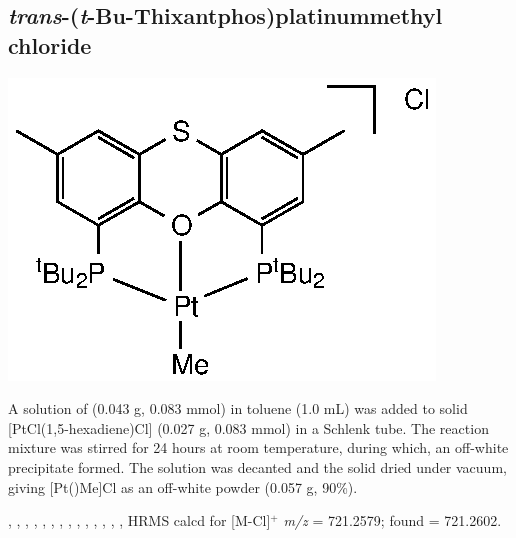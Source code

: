 \subsection*{\emph{trans}-(\emph{t}-Bu-Thixantphos)platinummethyl chloride}
\begin{structure}[h]
\begin{center}
\includegraphics{../Structures/StBuPtMe.eps}
\end{center}
\end{structure}

A solution of \tButhixantphos{} (0.043 g, 0.083 mmol) in toluene (1.0 mL) was added to solid [PtCl(1,5-hexadiene)Cl] (0.027 g, 0.083 mmol) in a Schlenk tube.  The reaction mixture was stirred for 24 hours at room temperature, during which, an off-white precipitate formed.  The solution was decanted and the   solid dried under vacuum, giving [Pt(\tButhixantphos)Me]Cl as an off-white powder (0.057 g, 90\%).

,
,
,
,
,
,
,
,
,
,
,
,
,
,
HRMS calcd for  [M-Cl]$^+$ \emph{m/z} = 721.2579; found = 721.2602.


